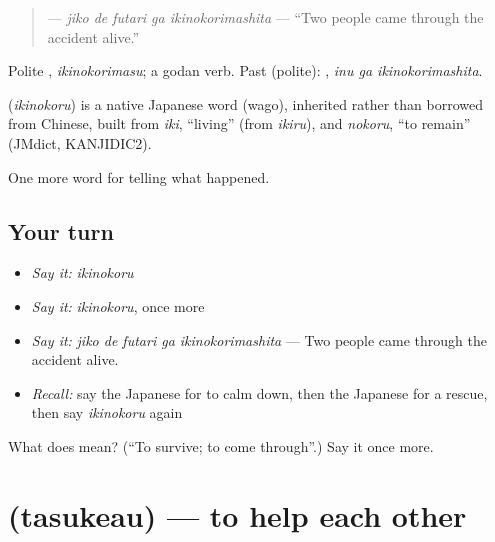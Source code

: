\begin{quote}
\textbf{  } — \emph{jiko de futari ga ikinokorimashita} — \textquotedblleft{}Two people came through the accident alive.\textquotedblright{}
\end{quote}

Polite \textbf{}, \emph{ikinokorimasu}; a godan verb. Past (polite): \textbf{ }, \emph{inu ga ikinokorimashita}.

\begin{cousinweb}
\textbf{} (\emph{ikinokoru}) is a native Japanese word (wago), inherited rather than borrowed from Chinese, built from \emph{iki}, \textquotedblleft{}living\textquotedblright{} (from \emph{ikiru}), and \emph{nokoru}, \textquotedblleft{}to remain\textquotedblright{} (JMdict, KANJIDIC2).
\end{cousinweb}

\begin{grammarlens}[title={What you've built}]
One more word for telling what happened.
\end{grammarlens}

\subsection*{Your turn}
\begin{itemize}
\raggedright
  \item \emph{Say it:} \emph{ikinokoru}
  \item \emph{Say it:} \emph{ikinokoru}, once more
  \item \emph{Say it:} \emph{jiko de futari ga ikinokorimashita} — Two people came through the accident alive.
  \item \emph{Recall:} say the Japanese for to calm down, then the Japanese for a rescue, then say \emph{ikinokoru} again
\end{itemize}

\begin{tcolorbox}[breakable,colback=teal!4,colframe=teal!35!black,title={Before you move on}]
What does  mean? (\textquotedblleft{}To survive; to come through\textquotedblright{}.) Say it once more.
\end{tcolorbox}
\section[\texorpdfstring{\ja{たすけあう} (tasukeau)}{たすけあう (tasukeau)}]{ (tasukeau) — to help each other}

